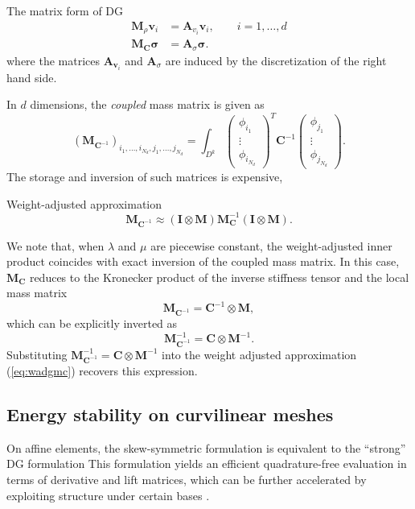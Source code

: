 \documentclass{siamart0216}
\newcommand{\LRp}[1]{\left( #1 \right)}
\begin{document}
The matrix form of DG 
\begin{align*}
\bm{M}_{\rho}\bm{v}_i &= \bm{A}_{{v}_i} \bm{v}_i, \qquad i = 1,\ldots,d\\
\bm{M}_{\bm{C}}\bm{\sigma} &= \bm{A}_{{\sigma}} \bm{\sigma}.
\end{align*}
where the matrices $\bm{A}_{\bm{v}_i}$ and $\bm{A}_{\sigma}$ are induced by the discretization of the right hand side.  

In $d$ dimensions, the \emph{coupled} mass matrix is given as 
\[
\LRp{\bm{M}_{\bm{C}^{-1}}}_{i_1,\ldots,i_{N_d},j_1,\ldots,j_{N_d}} = \int_{D^k} \LRp{\begin{array}{c}\phi_{i_1} \\ \vdots \\ \phi_{i_{N_d}}\end{array}}^T\bm{C}^{-1} \LRp{\begin{array}{c}\phi_{j_1}\\ \vdots \\ \phi_{j_{N_d}}\end{array}}.
\]
The storage and inversion of such matrices is expensive, 

Weight-adjusted approximation 
\begin{equation}
\bm{M}_{\bm{C}^{-1}} \approx \LRp{\bm{I} \otimes \bm{M}} \bm{M}_{\bm{C}}^{-1} \LRp{\bm{I} \otimes \bm{M}}.
\label{eq:wadgmc}
\end{equation}


We note that, when $\lambda$ and $\mu$ are piecewise constant, the weight-adjusted inner product coincides with exact inversion of the coupled mass matrix.  In this case, $\bm{M}_{\bm{C}}$ reduces to the Kronecker product of the inverse stiffness tensor and the local mass matrix 
\[
\bm{M}_{\bm{C}^{-1}} = \bm{C}^{-1}\otimes \bm{M},
\]
which can be explicitly inverted as
\[
\bm{M}^{-1}_{\bm{C}^{-1}} = \bm{C}\otimes \bm{M}^{-1}.  
\]
Substituting $\bm{M}_{\bm{C}^{-1}}^{-1} = \bm{C}\otimes \bm{M}^{-1}$ into the weight adjusted approximation (\ref{eq:wadgmc}) recovers this expression.%


\subsection{Energy stability on curvilinear meshes}

On affine elements, the skew-symmetric formulation is equivalent to the ``strong'' DG formulation 
This formulation yields an efficient quadrature-free evaluation in terms of derivative and lift matrices, which can be further accelerated by exploiting structure under certain bases \cite{chan2015gpu}.  
\end{document}
